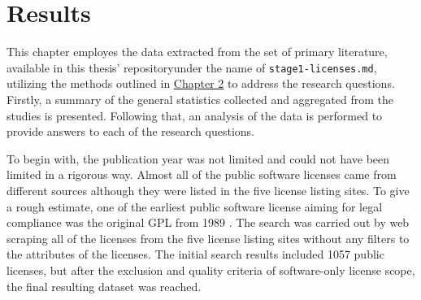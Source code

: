 \chapter{Results\label{results}}
This chapter employes the data extracted from the set of primary literature, available in this thesis' repository\footnotemark[1] under the name of \texttt{stage1-licenses.md}, utilizing the methods outlined in \hyperref[methods]{Chapter 2} to address the research questions. Firstly, a summary of the general statistics collected and aggregated from the studies is presented. Following that, an analysis of the data is performed to provide answers to each of the research questions.

To begin with, the publication year was not limited and could not have been limited in a rigorous way. Almost all of the public software licenses came from different sources although they were listed in the five license listing sites. To give a rough estimate, one of the earliest public software license aiming for legal compliance was the original GPL from 1989 \citep{license-history}. The search was carried out by web scraping all of the licenses from the five license listing sites without any filters to the attributes of the licenses. The initial search results included 1057 public licenses, but after the exclusion and quality criteria of software-only license scope, the final resulting dataset was reached.

